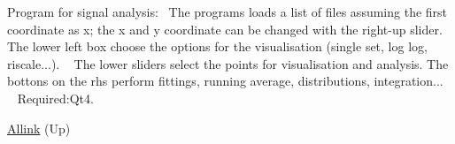 Program for signal analysis\+:~\newline
 The programs loads a list of files assuming the first coordinate as x; the x and y coordinate can be changed with the right-\/up slider. ~\newline
 The lower left box choose the options for the visualisation (single set, log log, riscale...). ~\newline
 The lower sliders select the points for visualisation and analysis. The bottons on the rhs perform fittings, running average, distributions, integration... ~\newline
 Required\+:Qt4. 
\begin{DoxyItemize}
\item \hyperlink{index}{Allink} (Up)  
\end{DoxyItemize}
